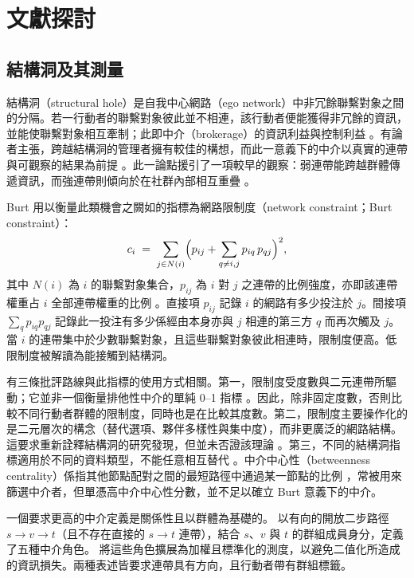 \chapter{文獻探討}
\label{zh:sec:theory}

\section{結構洞及其測量}
\label{zh:sec:theory_holes}

結構洞（structural hole）是自我中心網路（ego network）中非冗餘聯繫對象之間的分隔。若一行動者的聯繫對象彼此並不相連，該行動者便能獲得非冗餘的資訊，並能使聯繫對象相互牽制；此即中介（brokerage）的資訊利益與控制利益 \citep{burt1992structural}。有論者主張，跨越結構洞的管理者擁有較佳的構想，而此一意義下的中介以真實的連帶與可觀察的結果為前提 \citep{burt2004structural}。此一論點援引了一項較早的觀察：弱連帶能跨越群體傳遞資訊，而強連帶則傾向於在社群內部相互重疊 \citep{granovetter1973strength}。

Burt 用以衡量此類機會之闕如的指標為網路限制度（network constraint；Burt constraint）：
\begin{equation}
c_i \;=\; \sum_{j \in N(i)} \Bigl( p_{ij} + \sum_{q \neq i,j} p_{iq}\, p_{qj} \Bigr)^{2},
\label{zh:eq:constraint}
\end{equation}
其中 $N(i)$ 為 $i$ 的聯繫對象集合，$p_{ij}$ 為 $i$ 對 $j$ 之連帶的比例強度，亦即該連帶權重占 $i$ 全部連帶權重的比例 \citep{burt1992structural}。直接項 $p_{ij}$ 記錄 $i$ 的網路有多少投注於 $j$。間接項 $\sum_{q} p_{iq} p_{qj}$ 記錄此一投注有多少係經由本身亦與 $j$ 相連的第三方 $q$ 而再次觸及 $j$。當 $i$ 的連帶集中於少數聯繫對象，且這些聯繫對象彼此相連時，限制度便高。低限制度被解讀為能接觸到結構洞。

有三條批評路線與此指標的使用方式相關。第一，限制度受度數與二元連帶所驅動；它並非一個衡量排他性中介的單純 0--1 指標 \citep{everett2020unpacking}。因此，除非固定度數，否則比較不同行動者群體的限制度，同時也是在比較其度數。第二，限制度主要操作化的是二元層次的構念（替代選項、夥伴多樣性與集中度），而非更廣泛的網路結構。這要求重新詮釋結構洞的研究發現，但並未否證該理論 \citep{johnson2026reassessing}。第三，不同的結構洞指標適用於不同的資料類型，不能任意相互替代 \citep{saglietto2020research}。中介中心性（betweenness centrality）係指其他節點配對之間的最短路徑中通過某一節點的比例 \citep{freeman1977set}，常被用來篩選中介者，但單憑高中介中心性分數，並不足以確立 Burt 意義下的中介。

一個要求更高的中介定義是關係性且以群體為基礎的。\citet{gould1989structures} 以有向的開放二步路徑 $s \rightarrow v \rightarrow t$（且不存在直接的 $s \rightarrow t$ 連帶），結合 $s$、$v$ 與 $t$ 的群組成員身分，定義了五種中介角色。\citet{zador2022weighted} 將這些角色擴展為加權且標準化的測度，以避免二值化所造成的資訊損失。兩種表述皆要求連帶具有方向，且行動者帶有群組標籤。

